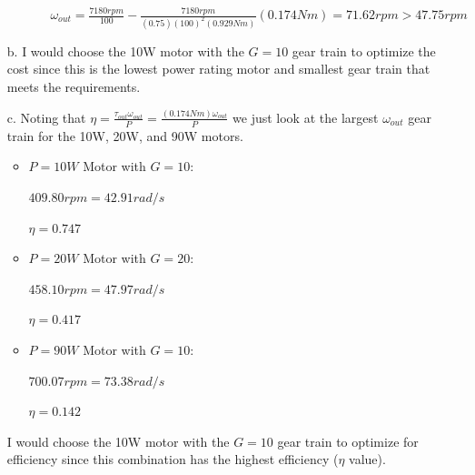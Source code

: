 \documentclass[12pt]{article}
\begin{document}
\begin{itemize}
\begin{itemize}
\begin{itemize}
            $\omega_{out} = \frac{7180rpm}{100} - \frac{7180rpm}{(0.75)(100)^2(0.929Nm)}(0.174Nm) = 71.62 rpm > 47.75 rpm$

        \end{itemize}
    \end{itemize}

    \item[b.] 
    I would choose the 10W motor with the $G = 10$ gear train to optimize the cost since this is the lowest power rating motor and smallest gear train that meets the requirements.

    \item[c.] 
    Noting that $\eta = \frac{\tau_{out} \omega_{out}}{P} = \frac{(0.174Nm) \omega_{out}}{P}$ we just look at the largest $\omega_{out}$ gear train for the 10W, 20W, and 90W motors.

    \begin{itemize}
        \item 
        $P = 10 W$ Motor with $G = 10$:

        $409.80 rpm = 42.91 rad/s$

        $\eta = 0.747$

        \item 
        $P = 20 W$ Motor with $G = 20$:

        $458.10 rpm = 47.97 rad/s$

        $\eta = 0.417$

        \item 
        $P = 90 W$ Motor with $G = 10$:

        $700.07 rpm = 73.38 rad/s$

        $\eta = 0.142$
        
    \end{itemize}

    I would choose the 10W motor with the $G = 10$ gear train to optimize for efficiency since this combination has the highest efficiency ($\eta$ value).

    
\end{itemize}
\end{document}
